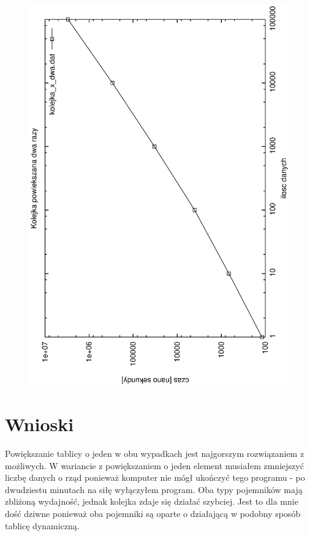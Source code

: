 \documentclass[a4paper,11pt]{report}
\begin{document}
\begin{figure}
  \begin{center}
    \includegraphics{wykresy/kolejka_x_dwa.eps}
    \caption{}
    \label{fig:}
  \end{center}
\end{figure}

\section{Wnioski}
Powiększanie tablicy o jeden w obu wypadkach jest najgorszym rozwiązaniem z możliwych. W wariancie z powiększaniem o jeden element musiałem zmniejszyć liczbę danych o rząd ponieważ komputer nie mógł ukończyć tego programu - po dwudziestu minutach na siłę wyłączyłem program.
Oba typy pojemników mają zbliżoną wydajność, jednak kolejka zdaje się działać szybciej. Jest to dla mnie dość dziwne ponieważ oba pojemniki są oparte o działającą w podobny sposób tablicę dynamiczną.
\end{document}
